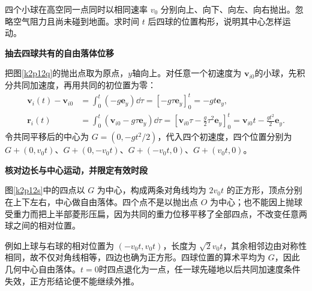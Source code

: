 \begin{question}\begin{example}[共同重力下的四球构形]\label{k2p12}
四个小球在高空同一点同时以相同速率 $v_0$ 分别向上、向下、向左、向右抛出。忽略空气阻力且尚未碰到地面。求时间 $t$ 后四球的位置构形，说明其中心怎样运动。\end{example}
\end{question}
\begin{solution}\textbf{抽去四球共有的自由落体位移}\par\nobreak
把图\ref{k2p12q}的抛出点取为原点，$y$轴向上。对任意一个初速度为 $\bm v_{i0}$的小球，先积分共同加速度，再用共同的初位置为零：
\begin{align*}
 \bm v_i(t)-\bm v_{i0}&=\int_0^t(-g\bm e_y)\dd\tau
 =[-g\tau\bm e_y]_0^t=-gt\bm e_y,\\
 \bm r_i(t)&=\int_0^t(\bm v_{i0}-g\tau\bm e_y)\dd\tau
 =\left[\bm v_{i0}\tau-\frac g2\tau^2\bm e_y\right]_0^t
 =\bm v_{i0}t-\frac{gt^2}{2}\bm e_y.
\end{align*}
令共同平移后的中心为 $G=(0,-gt^2/2)$，代入四个初速度，四个位置分别为 $G+(0,v_0t)$、$G+(0,-v_0t)$、$G+(-v_0t,0)$、$G+(v_0t,0)$。



\par\medskip{}\noindent\textbf{核对边长与中心运动，并限定有效时段}\par\nobreak
图\ref{k2p12s}中的四点以 $G$ 为中心，构成两条对角线均为 $2v_0t$ 的正方形，顶点分别在上下左右，中心做自由落体。四个点不是以抛出点 $O$ 为中心；也不能因上抛球受重力而把上半部菱形压扁，因为共同的重力位移平移了全部四点，不改变任意两球之间的相对位置。

例如上球与右球的相对位置为 $(-v_0t,v_0t)$，长度为 $\sqrt2v_0t$，其余相邻边由对称性相同，故不仅对角线相等，四边也确为正方形。四球位置的算术平均为 $G$，因此几何中心自由落体。$t=0$时四点退化为一点，任一球先碰地以后共同加速度条件失效，正方形结论便不能继续外推。\end{solution}

